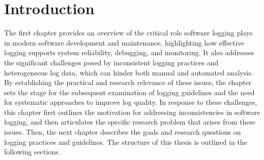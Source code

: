\chapter{Introduction} \label{chap:intro}

The first chapter provides an overview of the critical role software logging plays in modern
software development and maintenance, highlighting how effective logging supports system 
reliability, debugging, and monitoring. It also addresses the significant challenges posed 
by inconsistent logging practices and heterogeneous log data, which can hinder both manual 
and automated analysis. By establishing the practical and research relevance of these issues, 
the chapter sets the stage for the subsequent examination of logging guidelines and the need 
for systematic approaches to improve log quality.
In response to these challenges, this chapter first outlines the motivation for addressing 
inconsistencies in software logging, and then articulates the specific research problem that arises from these issues.
Then, the next chapter describes the goals and research questions on logging practices and guidelines.
The structure of this thesis is outlined in the following sections.

